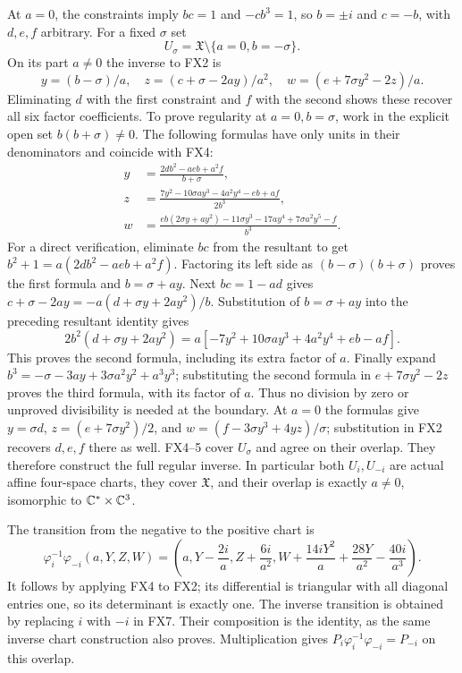 At $a=0$, the constraints imply $bc=1$ and $-cb^3=1$,
so $b=\pm i$ and $c=-b$, with $d,e,f$ arbitrary. For a fixed
$\sigma$ set
\[
 U_\sigma=\mathfrak X\setminus\{a=0,b=-\sigma\}.
 \tag{FX3}
\]
On its part $a\ne0$ the inverse to FX2 is
\[
 y=(b-\sigma)/a,\quad
 z=(c+\sigma-2ay)/a^2,\quad
 w=(e+7\sigma y^2-2z)/a. \tag{FX4}
\]
Eliminating $d$ with the first constraint and $f$ with the second
shows these recover all six factor coefficients.
To prove regularity at $a=0,b=\sigma$, work in the explicit open
set $b(b+\sigma)\ne0$. The following formulas have only units
in their denominators and coincide with FX4:
\[
 \begin{aligned}
 y&=\frac{2db^2-aeb+a^2f}{b+\sigma},\\
 z&=\frac{7y^2-10\sigma ay^3-4a^2y^4-eb+af}{2b^3},\\
 w&=\frac{eb(2\sigma y+ay^2)-11\sigma y^3-17ay^4
                                      +7\sigma a^2y^5-f}{b^3}.
 \end{aligned} \tag{FX5}
\]
For a direct verification, eliminate $bc$ from the resultant to
get $b^2+1=a(2db^2-aeb+a^2f)$. Factoring its left side as
$(b-\sigma)(b+\sigma)$ proves the first formula and
$b=\sigma+ay$. Next $bc=1-ad$ gives
$c+\sigma-2ay=-a(d+\sigma y+2ay^2)/b$.
Substitution of $b=\sigma+ay$ into the preceding resultant
identity gives
\[
 2b^2(d+\sigma y+2ay^2)
 =a[-7y^2+10\sigma ay^3+4a^2y^4+eb-af].
 \tag{FX6}
\]
This proves the second formula, including its extra factor of $a$.
Finally expand $b^3=-\sigma-3ay+3\sigma a^2y^2+a^3y^3$;
substituting the second formula in $e+7\sigma y^2-2z$ proves
the third formula, with its factor of $a$. Thus no division by
zero or unproved divisibility is needed at the boundary.
At $a=0$ the formulas give
$y=\sigma d$, $z=(e+7\sigma y^2)/2$, and
$w=(f-3\sigma y^3+4yz)/\sigma$; substitution in FX2 recovers
$d,e,f$ there as well. FX4--5 cover $U_\sigma$ and agree on
their overlap. They therefore construct the full regular inverse.
In particular both $U_i,U_{-i}$ are actual affine four-space
charts, they cover $\mathfrak X$, and their overlap is exactly
$a\ne0$, isomorphic to $\mathbb C^*\times\mathbb C^3$.

The transition from the negative to the positive chart is
\[
 \varphi_i^{-1}\varphi_{-i}(a,Y,Z,W)
 =\left(a,Y-\frac{2i}{a},Z+\frac{6i}{a^2},
 W+\frac{14iY^2}{a}+\frac{28Y}{a^2}-\frac{40i}{a^3}\right).
 \tag{FX7}
\]
It follows by applying FX4 to FX2; its differential is triangular
with all diagonal entries one, so its determinant is exactly one.
The inverse transition is obtained by replacing $i$ with $-i$
in FX7. Their composition is the identity, as the same inverse
chart construction also proves. Multiplication gives
$P_i\varphi_i^{-1}\varphi_{-i}=P_{-i}$ on this overlap.

